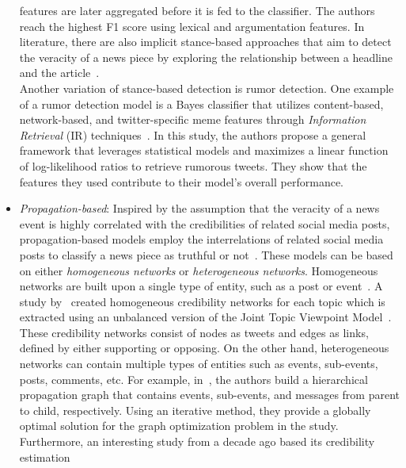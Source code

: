 \begin{itemize}
          features are later aggregated before it is fed to the classifier. The authors reach the highest F1 score using lexical and argumentation features. In literature, there are also implicit stance-based approaches that aim to detect the veracity of a news
          piece by exploring the relationship between a headline and the article~\parencite{ARetrospectiveAnalysisOfFNC_Hanselowski, StanceDetectionInFakeNews_Ghanem}.\\Another variation of stance-based detection is rumor detection. One example of a rumor detection model is a Bayes classifier that utilizes content-based, network-based, and twitter-specific meme features through \emph{Information Retrieval} (IR) techniques~\parencite{RumorHasIt_Qazvinian}.  In this study, the authors propose a general framework that leverages statistical models and maximizes a linear function of log-likelihood ratios to retrieve rumorous tweets. They show that the features they used contribute to their model's overall performance.
    \item  \emph{Propagation-based}: Inspired by the assumption that the veracity of a news event is highly correlated with the credibilities of related social media posts, propagation-based models employ the interrelations of related social media posts to classify a news piece as truthful or not~\parencite{FakeNewsDetectionOnSocialMediaADataMiningPerspective_Shu}. These models can be based on either \emph{homogeneous networks} or \emph{heterogeneous networks}.
          Homogeneous networks are built upon a single type of entity, such as a post or
          event~\parencite{NewsVerificationByExploitingConflictingSocialViewpoints_Jin}. A study
          by~\cite{NewsVerificationByExploitingConflictingSocialViewpoints_Jin} created homogeneous credibility networks for each topic which
          is extracted using an unbalanced version of the Joint Topic Viewpoint
          Model~\parencite{FindingAndArguingExpressions_Trabelsi}. These credibility networks consist of nodes as tweets and edges as links, defined by either supporting or opposing. On the other
          hand, heterogeneous networks can contain multiple types of entities such as events, sub-events, posts, comments, etc. For example, in~\parencite{NewsCredibilityEvaluationOnMicroblog_Jin}, the authors build a hierarchical propagation graph that contains events, sub-events, and messages from parent to child, respectively. Using an iterative method, they provide a globally optimal solution for the graph optimization problem in the study.\\Furthermore, an interesting study from a decade ago based its credibility estimation

\end{itemize}
